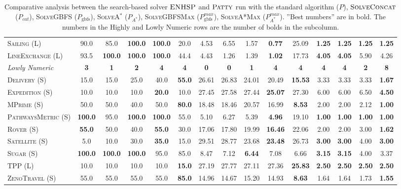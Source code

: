 \documentclass[11pt,landscape]{article}
\begin{document}
\begin{table*}[tb]
{\begin{tabular}{|l||ccccc||ccccc||cccc||}
\textsc{Sailing} (L)&90.0&85.0&\textbf{100.0}&\textbf{100.0}&20.0&4.53&6.55&1.57&\textbf{0.77}&25.09&\textbf{1.25}&\textbf{1.25}&\textbf{1.25}&\textbf{1.25}\\
\textsc{LineExchange} (L)&93.5&\textbf{100.0}&\textbf{100.0}&\textbf{100.0}&44.4&4.43&1.26&1.39&\textbf{1.02}&17.73&\textbf{4.05}&\textbf{4.05}&5.90&4.26
\\\hline
\textit{Lowly Numeric}&\textbf{3}&\textbf{1}&\textbf{2}&\textbf{4}&\textbf{4}&\textbf{0}&\textbf{0}&\textbf{1}&\textbf{4}&\textbf{4}&\textbf{4}&\textbf{4}&\textbf{2}&\textbf{8}\\\hline
\textsc{Delivery} (S)&15.0&15.0&25.0&40.0&\textbf{55.0}&26.61&26.83&24.01&20.49&\textbf{15.53}&3.33&3.33&3.33&\textbf{1.67}\\
\textsc{Expedition} (S)&10.0&10.0&10.0&\textbf{20.0}&10.0&27.45&27.58&27.44&\textbf{25.07}&27.30&6.00&6.00&6.50&\textbf{4.50}\\
\textsc{MPrime} (S)&50.0&50.0&40.0&50.0&\textbf{80.0}&18.48&18.46&20.57&16.99&\textbf{8.53}&2.00&2.00&2.12&\textbf{1.00}\\
\textsc{PathwaysMetric} (S)&\textbf{100.0}&95.0&\textbf{100.0}&\textbf{100.0}&55.0&5.10&6.27&5.39&\textbf{4.96}&19.10&\textbf{1.00}&\textbf{1.00}&\textbf{1.00}&\textbf{1.00}\\
\textsc{Rover} (S)&\textbf{55.0}&50.0&40.0&\textbf{55.0}&30.0&17.06&17.80&19.99&\textbf{16.46}&22.06&2.00&2.00&3.00&\textbf{1.62}\\
\textsc{Satellite} (S)&5.0&10.0&30.0&\textbf{35.0}&15.0&29.51&28.77&23.68&\textbf{23.48}&26.73&\textbf{3.00}&\textbf{3.00}&4.00&\textbf{3.00}\\
\textsc{Sugar} (S)&\textbf{100.0}&\textbf{100.0}&\textbf{100.0}&95.0&85.0&8.47&7.12&\textbf{6.44}&7.08&6.66&\textbf{3.15}&\textbf{3.15}&4.00&3.37\\
\textsc{TPP} (L)&10.0&10.0&10.0&10.0&\textbf{15.0}&27.19&27.77&27.11&27.36&\textbf{25.83}&\textbf{2.50}&\textbf{2.50}&\textbf{2.50}&\textbf{2.50}\\
\textsc{ZenoTravel} (S)&55.0&55.0&55.0&55.0&\textbf{85.0}&14.96&14.67&15.20&14.93&\textbf{8.63}&1.64&1.64&1.73&\textbf{1.55}
\\\hline

        \end{tabular}}
        \caption{Comparative analysis between the search-based solver $\textsc{ENHSP}$ and  $\textsc{Patty}$ run with the standard algorithm ($P$),  $\textsc{SolveConcat}$ ($P_{cat}$), \textsc{SolveGBFS} ($P_\text{gbfs}$), \textsc{SolveA}$^*$ ($P_{A^*}$), \textsc{SolveGBFSMax} ($P_\text{gbfs}^{max}$), \textsc{SolveA*Max} ($P_{A^*}^{max}$). ''Best numbers'' are in bold.  The numbers in the Highly and Lowly Numeric rows are the number of bolds in the subcolumn.}
        \label{tab:experiments}
        \end{table*}
        
\end{document}
